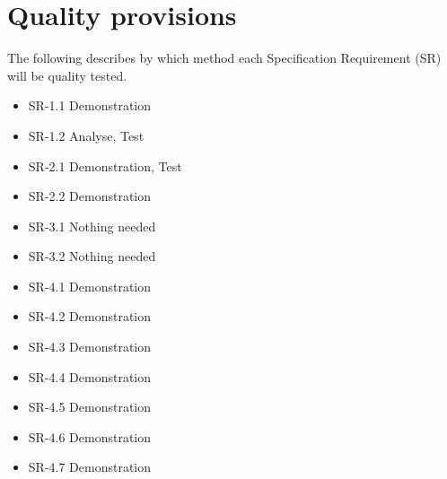 \documentclass[Main]{subfiles}
\begin{document}
\chapter{Quality provisions}
The following describes by which method each Specification Requirement (SR) will be quality tested.

\begin{itemize}
\item SR-1.1 Demonstration
\item SR-1.2 Analyse, Test

\item SR-2.1 Demonstration, Test
\item SR-2.2 Demonstration

\item SR-3.1 Nothing needed 
\item SR-3.2 Nothing needed 

\item SR-4.1 Demonstration
\item SR-4.2 Demonstration
\item SR-4.3 Demonstration
\item SR-4.4 Demonstration
\item SR-4.5 Demonstration
\item SR-4.6 Demonstration
\item SR-4.7 Demonstration
\end{itemize}
\end{document}
